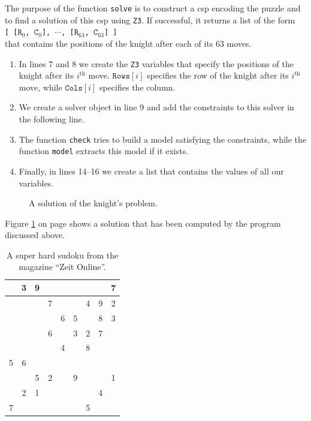 The purpose of the function \texttt{solve} is to construct a \Gls{csp} encoding the puzzle and to find a
solution of this \Gls{csp} using \texttt{Z3}.
If successful, it returns a list of the form
\\[0.2cm]
\hspace*{1.3cm}
\texttt{[ [$\mathtt{R}_0$, $\mathtt{C}_0$], $\cdots$, [$\mathtt{R}_{63}$, $\mathtt{C}_{63}$] ]} 
\\[0.2cm]
that contains the positions of the knight after each of its 63 moves.
\begin{enumerate}
\item In lines 7 and 8 we create the \texttt{Z3} variables that specify the positions of the knight after its
      $i^{\mathrm{th}}$ move.  $\texttt{Rows}[i]$ specifies the row of the knight after its
      $i^{\mathrm{th}}$ move, while $\texttt{Cols}[i]$ specifies the column.
\item We create a solver object in line 9 and add the constraints to this solver in the following line.
\item The function \texttt{check} tries to build a model satisfying the constraints, while the function
      \texttt{model} extracts this model if it exists.
\item Finally, in lines 14--16 we create a list that contains the values of all our variables.
\end{enumerate}

\begin{figure}[!ht]
  \centering
  \caption{A solution of the knight's problem.}
  \label{fig:knights-problem.png}
\end{figure}

\noindent
Figure \ref{fig:knights-problem.png} on page \pageref{fig:knights-problem.png} shows a solution that has been
computed by the program discussed above.







\begin{table}[h]
  \centering
  \begin{tabular}{||c|c|c||c|c|c||c|c|c||}
    \hline
    \hline
      & 3 & 9 &   &   &   &   &   & 7 \\
    \hline
      &   &   & 7 &   &   & 4 & 9 & 2 \\
    \hline
      &   &   &   & 6 & 5 &   & 8 & 3 \\
    \hline
    \hline
      &   &   & 6 &   & 3 & 2 & 7 &   \\
    \hline
      &   &   &   & 4 &   & 8 &   &   \\
    \hline
    5 & 6 &   &   &   &   &   &   &   \\
    \hline
    \hline
      &   & 5 & 2 &   & 9 &   &   & 1 \\
    \hline
      & 2 & 1 &   &   &   &   & 4 &   \\
    \hline
    7 &   &   &   &   &   & 5 &   &   \\
    \hline
    \hline
  \end{tabular}
  \caption{A super hard sudoku from the magazine ``Zeit Online''.}
  \label{tab:sudoku}
\end{table}


